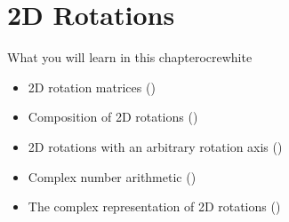 %




\renewcommand{\chaptergraphicspath}{../src/2Drotations/eps/}

\renewcommand{\chabbr}{2DROTS}

\chapter{2D Rotations\label{chap:2Drotations}}

\begin{messagebox}{What you will learn in this chapter}{ocre}{\icinfo}{white}
\begin{itemize}
	\item 2D rotation matrices ()
	\item Composition of 2D rotations ()
	\item 2D rotations with an arbitrary rotation axis ()
	\item Complex number arithmetic ()
	\item The complex representation of 2D rotations ()
\end{itemize}
\end{messagebox}



